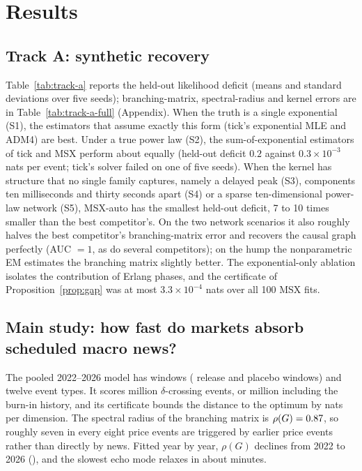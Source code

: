 \section{Results}\label{sec:results}

\subsection{Track A: synthetic recovery}
Table~\ref{tab:track-a} reports the held-out likelihood deficit (means and standard
deviations over five seeds); branching-matrix, spectral-radius and kernel errors are in
Table~\ref{tab:track-a-full} (Appendix).
When the truth is a single exponential (S1), the estimators that assume exactly this form
(tick's exponential MLE and ADM4) are best. Under a true power law (S2),
the sum-of-exponential estimators of tick and MSX perform about equally (held-out deficit $0.2$
against $0.3\times10^{-3}$ nats per event; tick's solver failed on one of five seeds). When the
kernel has structure that no single family captures, namely a delayed peak (S3), components ten
milliseconds and thirty seconds apart (S4) or a sparse ten-dimensional power-law network (S5),
MSX-auto has the smallest held-out deficit, 7 to 10 times smaller than the best competitor's. On the two network scenarios it also roughly halves
the best competitor's branching-matrix error and recovers the causal graph perfectly (AUC
$=1$, as do several competitors); on the hump the nonparametric EM estimates the branching
matrix slightly better. The
exponential-only ablation isolates the contribution of Erlang phases, and the
certificate of Proposition~\ref{prop:gap} was at most $3.3\times10^{-4}$ nats over all 100 MSX fits.

\begin{table}[!htbp]\centering\small
\caption{Track A, synthetic recovery: held-out log-likelihood deficit to the true model
($10^{-3}$ nats per event, lower is better; mean $\pm$ s.d.\ over five seeds). Bold: best;
underlined: second best; shaded: our estimators.}
\label{tab:track-a}
\setlength{\tabcolsep}{5pt}

\end{table}

\FloatBarrier
\subsection{Main study: how fast do markets absorb scheduled macro news?}
The pooled 2022--2026 model has \nWindows{} windows (\nNewsWindows{} release and
\nPlaceboWindows{} placebo windows) and twelve event types. It scores \nEventsScored{} million
$\delta$-crossing events, or \nEventsAll{} million including the burn-in history, and its
certificate bounds the distance to the optimum by \gapMaxPooled{} nats per dimension. The spectral
radius of the branching matrix is $\rho(G)=0.87$, so roughly seven in every eight price
events are triggered by earlier price events rather than directly by news. Fitted year by year, $\rho(G)$ declines from 2022
to 2026 (\rhoByYear), and the slowest echo mode relaxes in about \relaxPooled{} minutes.

